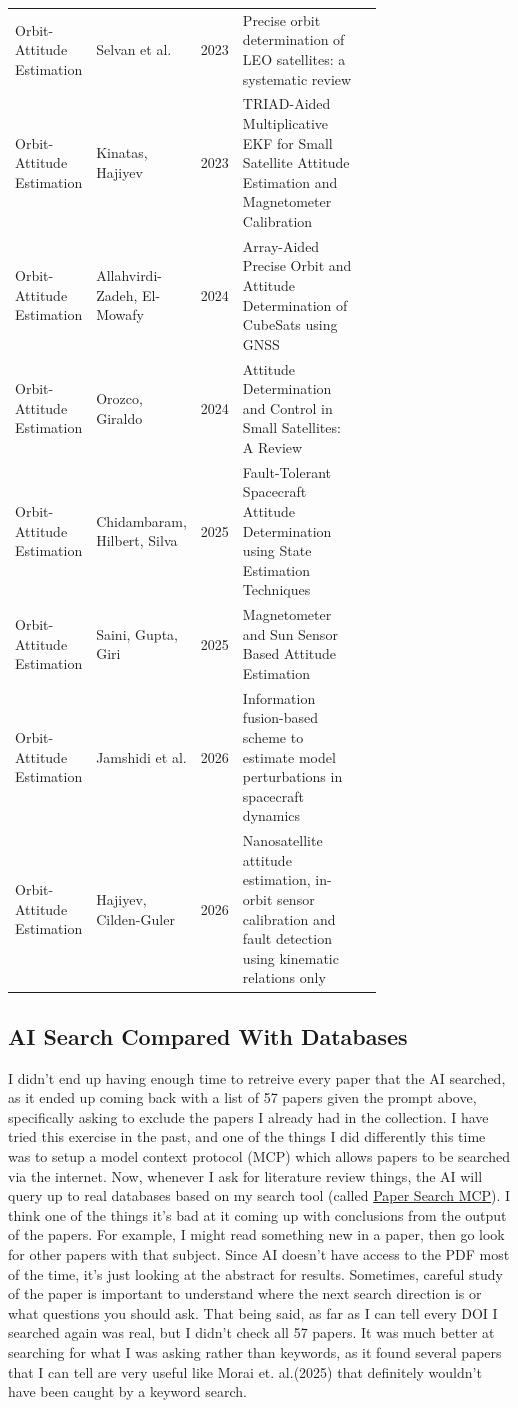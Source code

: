 \begin{longtable}{@{}p{0.14\linewidth}p{0.14\linewidth}rp{0.45\linewidth}l@{}}
    Orbit-Attitude Estimation & Selvan et al. & 2023 & Precise orbit determination of LEO satellites: a systematic review &  \\
    Orbit-Attitude Estimation & Kinatas, Hajiyev & 2023 & TRIAD-Aided Multiplicative EKF for Small Satellite Attitude Estimation and Magnetometer Calibration &  \\
    Orbit-Attitude Estimation & Allahvirdi-Zadeh, El-Mowafy & 2024 & Array-Aided Precise Orbit and Attitude Determination of CubeSats using GNSS &  \\
    Orbit-Attitude Estimation & Orozco, Giraldo & 2024 & Attitude Determination and Control in Small Satellites: A Review &  \\
    Orbit-Attitude Estimation & Chidambaram, Hilbert, Silva & 2025 & Fault-Tolerant Spacecraft Attitude Determination using State Estimation Techniques & \\
    Orbit-Attitude Estimation & Saini, Gupta, Giri & 2025 & Magnetometer and Sun Sensor Based Attitude Estimation &  \\
    Orbit-Attitude Estimation & Jamshidi et al. & 2026 & Information fusion-based scheme to estimate model perturbations in spacecraft dynamics &  \\
    Orbit-Attitude Estimation & Hajiyev, Cilden-Guler & 2026 & Nanosatellite attitude estimation, in-orbit sensor calibration and fault detection using kinematic relations only &  \\
  \bottomrule
\end{longtable}

\subsection{AI Search Compared With Databases}
I didn't end up having enough time to retreive every paper that the AI searched, as it ended up coming back with a list of 57 papers given the prompt above, specifically asking to exclude the papers I already had in the collection. I have tried this exercise in the past, and one of the things I did differently this time was to setup a model context protocol (MCP) which allows papers to be searched via the internet. Now, whenever I ask for literature review things, the AI will query up to real databases based on my search tool (called \href{https://github.com/openags/paper-search-mcp}{Paper Search MCP}). I think one of the things it's bad at it coming up with conclusions from the output of the papers. For example, I might read something new in a paper, then go look for other papers with that subject. Since AI doesn't have access to the PDF most of the time, it's just looking at the abstract for results. Sometimes, careful study of the paper is important to understand where the next search direction is or what questions you should ask. That being said, as far as I can tell every DOI I searched again was real, but I didn't check all 57 papers. It was much better at searching for what I was asking rather than keywords, as it found several papers that I can tell are very useful like Morai et. al.(2025) that definitely wouldn't have been caught by a keyword search.

